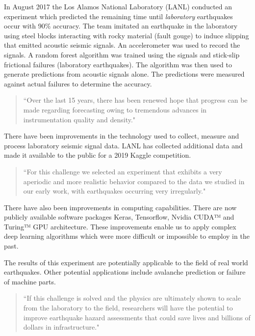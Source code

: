 \documentclass[]{llncs}
\begin{document}
In August 2017 the Los Alamos National Laboratory (LANL) conducted an experiment\cite{Bertrand} which predicted the remaining time until \emph{laboratory} earthquakes occur with 90\% accuracy. The team imitated an earthquake in the laboratory using steel blocks interacting with rocky material (fault gouge) to induce slipping that emitted acoustic seismic signals. An accelerometer was used to record the signals. A random forest algorithm was trained using the signals and stick‐slip frictional failures (laboratory earthquakes). The algorithm was then used to generate predictions from acoustic signals alone. The predictions were measured against actual failures to determine the accuracy.\cite{LANLNews}\par

\begin{quote}“Over the last 15 years, there has been renewed hope that progress can be made regarding forecasting owing to tremendous advances in instrumentation quality and density."\cite{Bertrand}\end{quote}

There have been improvements in the technology used to collect, measure and process  laboratory seismic signal data. LANL has collected additional data and made it available to the public for a 2019 Kaggle competition. \par
\begin{quote}
	“For this challenge we selected an experiment that exhibits a very aperiodic and more realistic behavior compared to the data we studied in our early work, with earthquakes occurring very irregularly.\cite{kaggle}" 
\end{quote}

There have also been improvements in computing capabilities. There are now publicly available software packages Keras, Tensorflow, Nvidia CUDA™ and Turing™ GPU architecture. These improvements enable us to apply complex deep learning algorithms which were more difficult or impossible to employ in the past.\par

The results of this experiment are potentially applicable to the field of real world earthquakes. Other potential applications include avalanche prediction or failure of machine parts.
\begin{quote}
	“If this challenge is solved and the physics are ultimately shown to scale from the laboratory to the field, researchers will have the potential to improve earthquake hazard assessments that could save lives and billions of dollars in infrastructure.\cite{kaggle}"
\end{quote}
\end{document}
